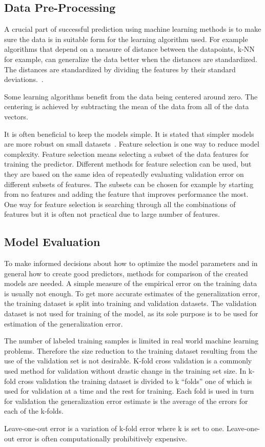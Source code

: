 \subsection{Data Pre-Processing}
\label{sec:data-pre-processing}
A crucial part of successful prediction using machine learning methods is to make sure the data is in suitable form for the learning algorithm used. For example algorithms that depend on a measure of distance between the datapoints, k-NN for example, can generalize the data better when the distances are standardized. The distances are standardized by dividing the features by their standard deviations.~\cite{alpaydin:2004:introduction}.

Some learning algorithms benefit from the data being centered around zero. The centering is achieved by subtracting the mean of the data from all of the data vectors.~\cite{alpaydin:2004:introduction}

It is often beneficial to keep the models simple. It is stated that simpler models are more robust on small datasets~\cite{alpaydin:2004:introduction}. Feature selection is one way to reduce model complexity. Feature selection means selecting a subset of the data features for training the predictor. Different methods for feature selection can be used, but they are based on the same idea of repeatedly evaluating validation error on different subsets of features. The subsets can be chosen for example by starting from no features and adding the feature that improves performance the most. One way for feature selection is searching through all the combinations of features but it is often not practical due to large number of features.~\cite{alpaydin:2004:introduction}

\subsection{Model Evaluation}
To make informed decisions about how to optimize the model parameters and in general how to create good predictors, methods for comparison of the created models are needed. A simple measure of the empirical error on the training data is usually not enough. To get more accurate estimates of the generalization error, the training dataset is split into training and validation datasets. The validation dataset is not used for training of the model, as its sole purpose is to be used for estimation of the generalization error.~\cite{alpaydin:2004:introduction}

The number of labeled training samples is limited in real world machine learning problems. Therefore the size reduction to the training dataset resulting from the use of the validation set is not desirable. K-fold cross validation is a commonly used method for validation without drastic change in the training set size. In k-fold cross validation the training dataset is divided to k ``folds'' one of which is used for validation at a time and the rest for training. Each fold is used in turn for validation the generalization error estimate is the average of the errors for each of the k-folds.~\cite{alpaydin:2004:introduction}

Leave-one-out error is a variation of k-fold error where k is set to one. Leave-one-out error is often computationally prohibitively expensive.

